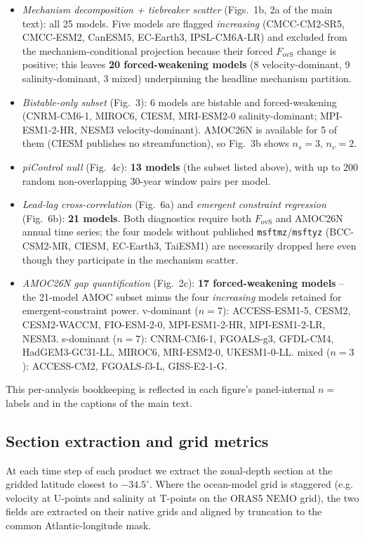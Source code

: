 \documentclass[11pt,a4paper]{article}
\newcommand{\Fovs}{F_\mathrm{ovS}}
\begin{document}
\begin{itemize}
\item \emph{Mechanism decomposition + tiebreaker scatter} (Figs.~1b, 2a of the main text): all 25 models. Five models are flagged \emph{increasing} (CMCC-CM2-SR5, CMCC-ESM2, CanESM5, EC-Earth3, IPSL-CM6A-LR) and excluded from the mechanism-conditional projection because their forced $\Fovs$ change is positive; this leaves \textbf{20 forced-weakening models} (8 velocity-dominant, 9 salinity-dominant, 3 mixed) underpinning the headline mechanism partition.
\item \emph{Bistable-only subset} (Fig.~3): 6 models are bistable and forced-weakening (CNRM-CM6-1, MIROC6, CIESM, MRI-ESM2-0 salinity-dominant; MPI-ESM1-2-HR, NESM3 velocity-dominant). AMOC26N is available for 5 of them (CIESM publishes no streamfunction), so Fig.~3b shows $n_s = 3$, $n_v = 2$.
\item \emph{piControl null} (Fig.~4c): \textbf{13 models} (the subset listed above), with up to 200 random non-overlapping 30-year window pairs per model.
\item \emph{Lead-lag cross-correlation} (Fig.~6a) and \emph{emergent constraint regression} (Fig.~6b): \textbf{21 models}. Both diagnostics require both $F_{\mathrm{ovS}}$ and AMOC26N annual time series; the four models without published \texttt{msftmz}/\texttt{msftyz} (BCC-CSM2-MR, CIESM, EC-Earth3, TaiESM1) are necessarily dropped here even though they participate in the mechanism scatter.
\item \emph{AMOC26N gap quantification} (Fig.~2c): \textbf{17 forced-weakening models} -- the 21-model AMOC subset minus the four \emph{increasing} models retained for emergent-constraint power. v-dominant ($n=7$): ACCESS-ESM1-5, CESM2, CESM2-WACCM, FIO-ESM-2-0, MPI-ESM1-2-HR, MPI-ESM1-2-LR, NESM3. s-dominant ($n=7$): CNRM-CM6-1, FGOALS-g3, GFDL-CM4, HadGEM3-GC31-LL, MIROC6, MRI-ESM2-0, UKESM1-0-LL. mixed ($n=3$): ACCESS-CM2, FGOALS-f3-L, GISS-E2-1-G.
\end{itemize}

This per-analysis bookkeeping is reflected in each figure's panel-internal $n=$ labels and in the captions of the main text.

\subsection*{Section extraction and grid metrics}

At each time step of each product we extract the zonal-depth section at the gridded latitude closest to $-34.5^\circ$. Where the ocean-model grid is staggered (e.g. velocity at U-points and salinity at T-points on the ORAS5 NEMO grid), the two fields are extracted on their native grids and aligned by truncation to the common Atlantic-longitude mask.
\end{document}
